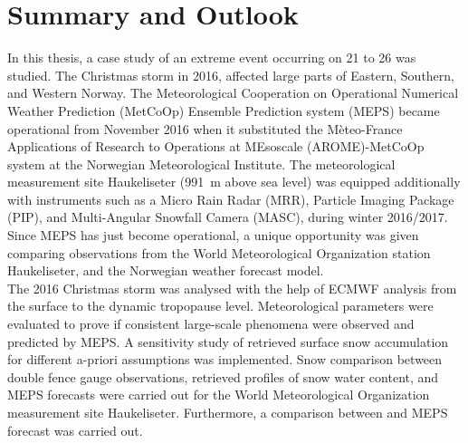 
\chapter{Summary and Outlook}\label{ch:Summary}
In this thesis, a case study of an extreme event occurring on \num{21} to \SI{26}{\dec} was studied. The Christmas storm in 2016, affected large parts of Eastern, Southern, and Western Norway. The Meteorological Cooperation on Operational Numerical Weather Prediction (MetCoOp) Ensemble Prediction system (MEPS) became operational from November 2016 when it substituted the Mèteo-France Applications of Research to Operations at MEsoscale (AROME)-MetCoOp system at the Norwegian Meteorological Institute. 
The meteorological measurement site Haukeliseter (\SI{991}{\metre} above sea level) was equipped additionally with instruments such as a Micro Rain Radar (MRR), Particle Imaging Package (PIP), and Multi-Angular Snowfall Camera (MASC), during winter 2016/2017. 
Since MEPS has just become operational, a unique opportunity was given comparing observations from the World Meteorological Organization station Haukeliseter, and the Norwegian weather forecast model.
\\
The 2016 Christmas storm was analysed with the help of ECMWF analysis from the surface to the dynamic tropopause level. Meteorological parameters were evaluated to prove if consistent large-scale phenomena were observed and predicted by MEPS.
A sensitivity study of retrieved surface snow accumulation for different a-priori assumptions was implemented. 
Snow comparison between double fence gauge observations, retrieved profiles of snow water content, and MEPS forecasts were carried out for the World Meteorological Organization measurement site Haukeliseter. 
Furthermore, a comparison between  and MEPS forecast was carried out. %
\par\medskip
\noindent
